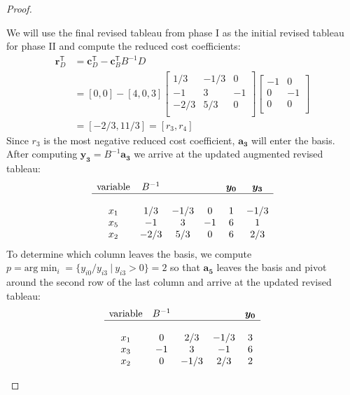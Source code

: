 \documentclass[12pt]{article}
\theoremstyle{definition}
\newcommand{\vect}[1]{\boldsymbol{#1}}
\newcommand{\tran}{\mathsf{T}}
\begin{document}
\begin{proof}
\begin{enumerate}
      We will use the final revised tableau from phase I as the initial revised tableau for phase II
      and compute the reduced cost coefficients:
      \begin{align*}
        \vect{r}_D^\tran &= \vect{c}_D^\tran - \vect{c}_B^\tran B^{-1} D \\
        &= [0, 0] - [4, 0, 3]
        \begin{bmatrix}
          1/3 & -1/3 & 0\\
          -1 & 3 & -1\\
          -2/3 & 5/3 & 0\\
        \end{bmatrix}
        \begin{bmatrix}
          -1 & 0 \\
          0 & -1 \\
          0 & 0 \\
        \end{bmatrix} \\
        &= [-2/3, 11/3] = [r_3,r_4]
      \end{align*}
      Since $r_3$ is the most negative reduced cost coefficient, $\vect{a_3}$
      will enter the basis. After computing $\vect{y_3} = B^{-1}\vect{a_3}$ we
      arrive at the updated augmented revised tableau:
      \begin{align*}
        \begin{matrix}
          \text{variable} & B^{-1} & & & \vect{y_0} & \vect{y_3}\\
          \hline \\
          x_1 & 1/3 & -1/3 & 0 & 1 & -1/3\\
          x_5 & -1 & 3 & -1 & 6 & 1\\
          x_2 & -2/3 & 5/3 & 0 & 6 & 2/3\\
        \end{matrix}
      \end{align*}
      To determine which column leaves the basis, we compute
      $p = \text{arg}\min_i = \{y_{i0} / y_{i3} \ | \ y_{i3} > 0\} = 2$ so that $\vect{a_5}$
      leaves the basis and pivot
      around the second row of the last column and arrive at the updated revised tableau:
      \begin{align*}
        \begin{matrix}
          \text{variable} & B^{-1} & & & \vect{y_0}\\
          \hline \\
          x_1 & 0 & 2/3 & -1/3 & 3\\
          x_3 & -1 & 3 & -1 & 6\\
          x_2 & 0 & -1/3 & 2/3 & 2\\
        \end{matrix}
      \end{align*}


\end{enumerate}
\end{proof}
\end{document}
